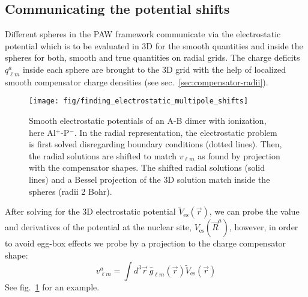 \documentclass[oribibl]{llncs}
\newcommand{\um}[1]{_{\mathrm{#1}}}
\begin{document}
\subsection{Communicating the potential shifts}\label{sec:multipole-shifts}
Different spheres in the PAW framework communicate via the electrostatic
potential which is to be evaluated in 3D for the smooth quantities
and inside the spheres for both, smooth and true quantities on radial grids.
The charge deficits $q^a_{\ell m}$ inside each sphere are
brought to the 3D grid with the help of localized smooth compensator charge densities 
(see sec.~\ref{sec:compensator-radii}).
%
\begin{figure}
  \begin{minipage}[c]{.990\textwidth}
	\texttt{[image: fig/finding\_electrostatic\_multipole\_shifts]} %
  \end{minipage}\hfill
  \begin{minipage}[c]{.009\textwidth}
  \end{minipage}
  \label{fig:multipole-shifts}
  \caption{Smooth electrostatic potentials of an A-B dimer with ionization, here Al$^+$-P$^-$.
  In the radial representation, the electrostatic problem is first solved disregarding boundary conditions (dotted lines).
  Then, the radial solutions are shifted to match $v_{\ell m}$ as found by projection with the compensator shapes.
  The shifted radial solutions (solid lines) and a Bessel projection of the 3D solution match inside the spheres (radii 2 Bohr).}
\end{figure}
%
%
After solving for the 3D electrostatic potential $\tilde V\um{es}(\vec r)$,
we can probe the value and derivatives of the potential at the nuclear site, $V\um{es}(\vec R^a)$,
however, in order to avoid egg-box effects we
probe by a projection to the charge compensator shape:
$$ v^a_{\ell m} = \int d^3 \vec r \  \hat g_{\ell m}(\vec r) \tilde V\um{es}(\vec r) $$
See fig.~\ref{fig:multipole-shifts} for an example.
\end{document}
